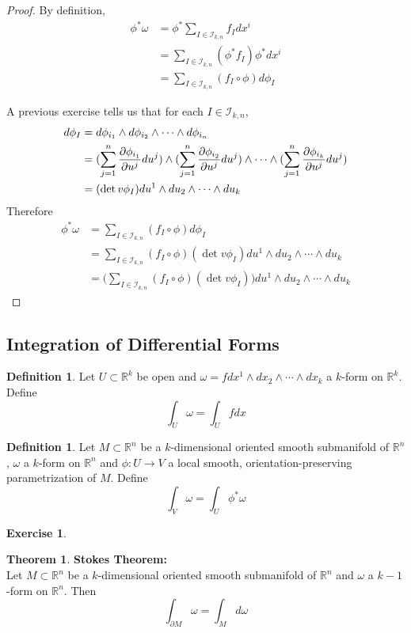 \documentclass[12pt]{amsart}
\theoremstyle{definition}
\newtheorem{defn}[definition]{Definition}
\newtheorem{thm}[definition]{Theorem}
\newtheorem{ex}[definition]{Exercise}
\newcommand{\om}{\omega}
\newcommand{\R}{\mathbb{R}}
\newcommand{\MI}{\mathcal{I}}
\begin{document}
	\begin{proof}
		By definition,  
		\begin{align*}
			\phi^* \om 
			&= \phi^*  \sum_{I \in \MI_{k,n}} f_Idx^i \\
			&= \sum_{I \in \MI_{k,n}} (\phi^*f_I) \phi^*dx^i \\
			&= \sum_{I \in \MI_{k,n}} (f_I \circ  \phi)  d\phi_I
		\end{align*}
	
	A previous exercise tells us that for each $I \in \MI_{k,n}$,
	\begin{align*}
		d \phi_I 
		&= d\phi_{i_1} \wedge d\phi_{i_2} \wedge \cdots \wedge d \phi_{i_n} \\
		&= (\sum_{j = 1}^n \pdv{\phi_{i_1}}{u^j} du^j) \wedge (\sum_{j = 1}^n \pdv{\phi_{i_2}}{u^j} du^j) \wedge \cdots \wedge (\sum_{j = 1}^n \pdv{\phi_{i_k}}{u^j} du^j)   \\
		&= (\det v\phi_I)du^1 \wedge du_2 \wedge \cdots \wedge du_k
	\end{align*}
	Therefore 
	\begin{align*}
		\phi^* \om
		&= \sum_{I \in \MI_{k,n}} (f_I \circ  \phi)  d\phi_I \\
		&= \sum_{I \in \MI_{k,n}} (f_I \circ  \phi)  (\det v\phi_I)du^1 \wedge du_2 \wedge \cdots \wedge du_k \\
		&= \bigg(\sum_{I \in \MI_{k,n}} (f_I \circ  \phi)  (\det v\phi_I)\bigg)du^1 \wedge du_2 \wedge \cdots \wedge du_k
	\end{align*}
	\end{proof}
	
	\subsection{Integration of Differential Forms}
	
	\begin{defn}
		Let $U \subset \R^k$ be open and $\om = f dx^1 \wedge dx_2 \wedge \cdots \wedge dx_k$ a $k$-form on $\R^k$. Define $$\int_U \om = \int_U f dx$$
	\end{defn}
	
	\begin{defn}
		Let $M \subset \R^n$ be a $k$-dimensional oriented smooth submanifold of $\R^n$, $\om$ a $k$-form on $\R^n$ and $\phi: U \rightarrow V$ a local smooth, orientation-preserving parametrization of $M$. Define $$\int_V \om = \int_U \phi^*\om $$
	\end{defn} 

	\begin{ex}
		
	\end{ex}

	\begin{thm}\textbf{Stokes Theorem:}\\
		Let $M \subset \R^n$ be a $k$-dimensional oriented smooth submanifold of $\R^n$ and $\om$ a $k-1$-form on $\R^n$. Then $$\int_{\partial M} \om = \int_M d \om$$
	\end{thm}
\end{document}

